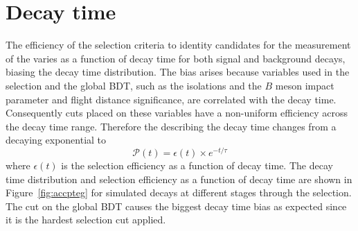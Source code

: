 \section{Decay time \pdfs}
\label{sec:DTpdfs}
The efficiency of the selection criteria to identity candidates for the measurement of the \bsmumu \el varies as a function of decay time for both signal and background decays, biasing the decay time distribution. The bias arises because variables used in the selection and the global BDT, such as the isolations and the $B$ meson impact parameter and flight distance significance, are correlated with the decay time. Consequently cuts placed on these variables have a non-uniform efficiency across the decay time range. Therefore the \pdf describing the decay time changes from a decaying exponential to
\begin{equation}
\mathcal{P}(t) = \epsilon(t) \times e^{-t/\tau}
\label{eq:DTpdf}
\end{equation}
where $\epsilon(t)$ is the selection efficiency as a function of decay time. 
The decay time distribution and selection efficiency as a function of decay time are shown in Figure~\ref{fig:accpteg} for simulated \bsmumu decays at different stages through the selection. The cut on the global BDT causes the biggest decay time bias as expected since it is the hardest selection cut applied. %
